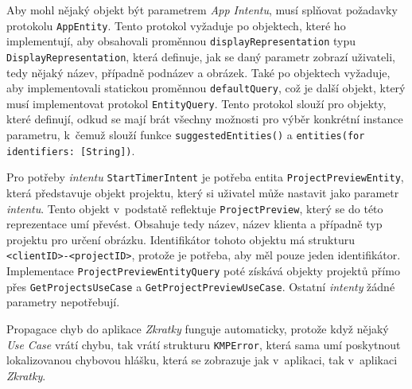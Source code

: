 Aby mohl nějaký objekt být parametrem \emph{App Intentu}, musí splňovat požadavky protokolu \texttt{AppEntity}. Tento protokol vyžaduje po objektech, které ho implementují, aby obsahovali proměnnou \texttt{displayRepresentation} typu \texttt{DisplayRepresentation}, která definuje, jak se daný parametr zobrazí uživateli, tedy nějaký název, případně podnázev a obrázek. Také po objektech vyžaduje, aby implementovali statickou proměnnou \texttt{defaultQuery}, což je další objekt, který musí implementovat protokol \texttt{EntityQuery}. Tento protokol slouží pro objekty, které definují, odkud se mají brát všechny možnosti pro výběr konkrétní instance parametru, k~čemuž slouží funkce \texttt{suggestedEntities()} a \texttt{entities(for identifiers: [String])}.

Pro potřeby \emph{intentu} \texttt{StartTimerIntent} je potřeba entita \texttt{ProjectPreviewEntity}, která představuje objekt projektu, který si uživatel může nastavit jako parametr \emph{intentu}. Tento objekt v~podstatě reflektuje \texttt{ProjectPreview}, který se do této reprezentace umí převést. Obsahuje tedy název, název klienta a případně typ projektu pro určení obrázku. Identifikátor tohoto objektu má strukturu \texttt{<clientID>-<projectID>}, protože je potřeba, aby měl pouze jeden identifikátor. Implementace \texttt{ProjectPreviewEntityQuery} poté získává objekty projektů přímo přes \texttt{GetProjectsUseCase} a \texttt{GetProjectPreviewUseCase}. Ostatní \emph{intenty} žádné parametry nepotřebují.

Propagace chyb do aplikace \emph{Zkratky} funguje automaticky, protože když nějaký \emph{Use Case} vrátí chybu, tak vrátí strukturu \texttt{KMPError}, která sama umí poskytnout lokalizovanou chybovou hlášku, která se zobrazuje jak v~aplikaci, tak v~aplikaci \emph{Zkratky}.
































